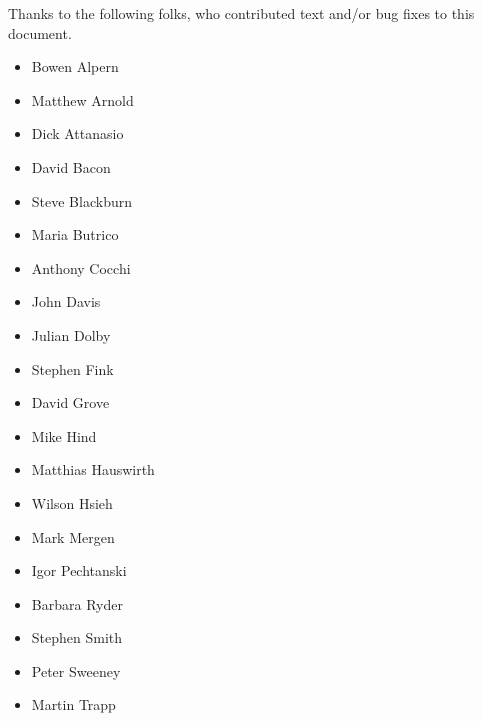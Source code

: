 Thanks to the following folks, who contributed text and/or bug fixes to
this document.

\begin{itemize}
\item Bowen Alpern
\item Matthew Arnold
\item Dick Attanasio
\item David Bacon
\item Steve Blackburn
\item Maria Butrico
\item Anthony Cocchi
\item John Davis
\item Julian Dolby
\item Stephen Fink
\item David Grove
\item Mike Hind
\item Matthias Hauswirth
\item Wilson Hsieh
\item Mark Mergen
\item Igor Pechtanski
\item Barbara Ryder
\item Stephen Smith
\item Peter Sweeney
\item Martin Trapp
\end{itemize}
